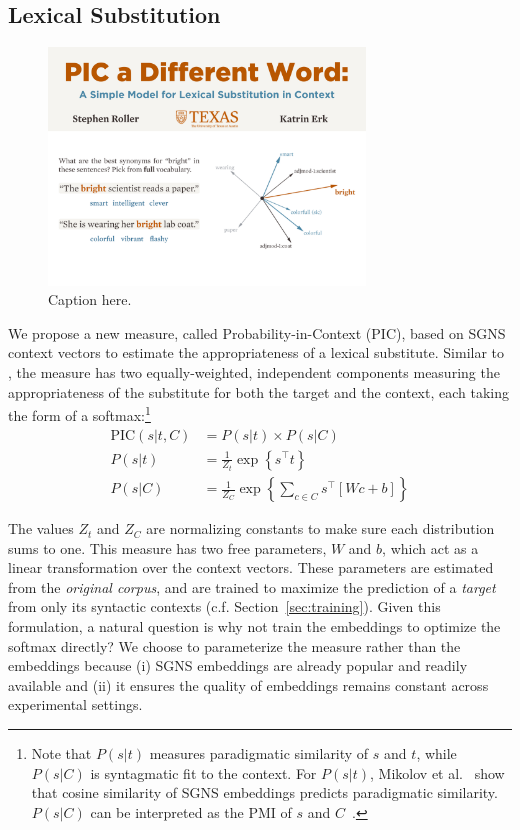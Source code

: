 \documentclass[letterpaper]{article}
\begin{document}
\subsection{Lexical Substitution}

\begin{figure}
  \centering
  \includegraphics[width=0.75\textwidth]{figures/substitution}
  \caption{Caption here.}
  \label{fig:substitution}
\end{figure}



We propose a new measure, called Probability-in-Context (PIC), based
on SGNS context vectors to estimate the appropriateness
of a lexical substitute. Similar to \balAddCos, the measure has two equally-weighted,
independent components measuring the appropriateness of the substitute
for both the target and the context, each taking the form of a softmax:\footnote{Note that $P(s|t)$ measures paradigmatic similarity
  of $s$ and $t$, while $P(s|C)$ is syntagmatic fit to the
  context.
  For $P(s|t)$,
  Mikolov et al.~ show that cosine
  similarity of SGNS embeddings predicts
  paradigmatic similarity. $P(s|C)$ can be interpreted as the PMI of
  $s$ and $C$~\cite{Levy:2014tp}.}
\begin{align*}
  \mbox{PIC}(s | t, C) &= P(s | t) \times P(s | C)\\
  P(s | t) &= \frac{1}{Z_t}\exp\left\{s^\top t\right\}\\ %
  P(s | C) &= \frac{1}{Z_C}\exp\left\{\sum_{c\in C}s^\top\left[Wc + b\right]\right\}
\end{align*}

The values $Z_t$ and $Z_C$ are normalizing constants to make sure each
distribution sums to one. This measure has two free parameters, $W$ and $b$,
which act as a linear transformation over the context vectors. These parameters
are estimated from the {\em original corpus}, and are trained to maximize
the prediction of a {\em target} from only its syntactic contexts (c.f. Section~\ref{sec:training}).
Given this formulation, a natural question is why not train the embeddings to optimize the
softmax directly? We choose to parameterize the measure rather than the
embeddings because (i) SGNS embeddings are already popular and readily
available and
(ii) it ensures the quality of embeddings remains constant across experimental 
settings.
\end{document}
